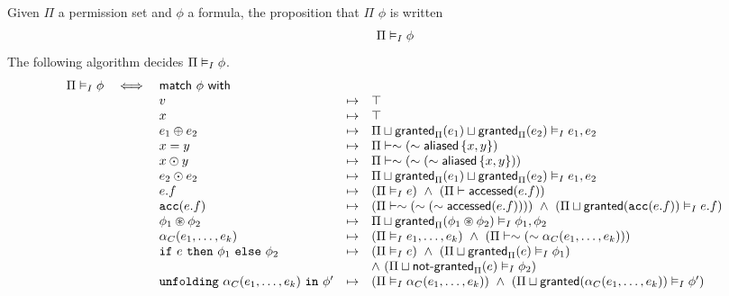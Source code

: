 Given $\Pi$ a permission set and $\phi$ a formula, the proposition that $\Pi$  $\phi$ is written
$$
\Pi \vDash_I \phi
$$
The following algorithm decides $\Pi \vDash_I \phi$.
\begin{align*}
\begin{array}{rclrl}
\Pi \frames \phi & \iff & \tsf{match} \ \phi \ \tsf{with} && \\
%
%
&& v &\mt&
  \top
\\
&& x &\mt&
  \top
\\
&& e_1 \oplus e_2 &\mt&
  \Pi \merge \grantedPi(e_1) \merge \grantedPi(e_2) \frames e_1, e_2
\\
&& x = y &\mt&
  \Pi \entails \pnot (\pnot \aliased\set{x,y})
\\
&& x \odot y &\mt&
  \Pi \entails \pnot (\pnot (\pnot \aliased\set{x,y}))
\\
&& e_2 \odot e_2 &\mt&
  \Pi \merge \grantedPi(e_1) \merge \grantedPi(e_2) \frames e_1, e_2
\\
&& e.f &\mt&
  (\Pi \frames e) \ \land \
  (\Pi \entails \accessed(e.f))
\\
&& \cacc(e.f) &\mt&
  (\Pi \entails \pnot (\pnot (\pnot \accessed(e.f)))) \ \land \
  (\Pi \merge \granted(\cacc(e.f)) \frames e.f)
\\
&& \phi_1 \cast \phi_2 &\mt&
  \Pi \merge \grantedPi(\phi_1 \cast \phi_2) \frames
  \phi_1, \phi_2
\\
&& \alpha_C(e_1, \dots, e_k) &\mt&
  (\Pi \frames e_1, \dots, e_k) \ \land \
  (\Pi \entails \pnot (\pnot \alpha_C(e_1, \dots, e_k)))
\\
&& \cif \ e \ \cthen \ \phi_1 \ \celse \ \phi_2 &\mt&
  (\Pi \frames e) \ \land \
  (\Pi \merge \grantedPi(e) \frames \phi_1) \\ &&&& \land \
  (\Pi \merge \notgrantedPi(e) \frames \phi_2)
\\
&& \cunfolding \ \alpha_C(e_1, \dots, e_k) \ \cin \ \phi\p &\mt&
  (\Pi \frames \alpha_C(e_1, \dots, e_k)) \ \land \
  (\Pi \merge \granted(\alpha_C(e_1, \dots, e_k)) \frames \phi\p)
\end{array}
\end{align*}

